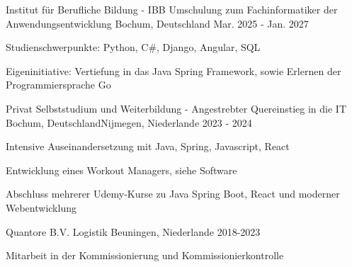 

\begin{cventries}

  \cventry
  {Institut für Berufliche Bildung - IBB} %
  {Umschulung zum Fachinformatiker der Anwendungsentwicklung} %
  {Bochum, Deutschland} %
  {Mar. 2025 - Jan. 2027} %
  {
    \begin{cvitems} %
      \item {Studienschwerpunkte: Python, C\#, Django, Angular, SQL}
      \item {Eigeninitiative: Vertiefung in das Java Spring Framework, sowie Erlernen der Programmiersprache Go}
    \end{cvitems}
  }

  \cventry
  {Privat} %
  {Selbststudium und Weiterbildung - Angestrebter Quereinstieg in die IT} %
  {\newline Bochum, Deutschland\newline Nijmegen, Niederlande} %
  {2023 - 2024} %
  {
    \begin{cvitems} %
      \item {Intensive Auseinandersetzung mit Java, Spring, Javascript, React}
      \item {Entwicklung eines Workout Managers, siehe Software}
      \item {Abschluss mehrerer Udemy-Kurse zu Java Spring Boot, React und moderner Webentwicklung}
    \end{cvitems}
  }

  \cventry
  {Quantore B.V.} %
  {Logistik} %
  {Beuningen, Niederlande} %
  {2018-2023} %
  {
    \begin{cvitems} %
      \item {Mitarbeit in der Kommissionierung und Kommissionierkontrolle}
    \end{cvitems}
  }



\end{cventries}
